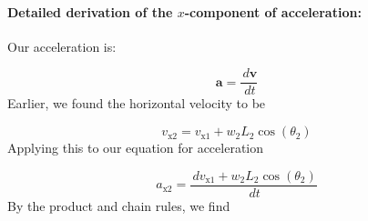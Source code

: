\documentclass[12pt]{article}
\begin{document}
\paragraph{Detailed derivation of the $x$-component of acceleration:}
\label{GD:accelerationX2Deriv}
Our acceleration is:

\begin{displaymath}
\symbf{a}=\frac{\,d\symbf{v}}{\,dt}
\end{displaymath}
Earlier, we found the horizontal velocity to be

\begin{displaymath}
{v_{\text{x}2}}={v_{\text{x}1}}+{w_{2}} {L_{2}} \cos\left({θ_{2}}\right)
\end{displaymath}
Applying this to our equation for acceleration

\begin{displaymath}
{a_{\text{x}2}}=\frac{\,d{v_{\text{x}1}}+{w_{2}} {L_{2}} \cos\left({θ_{2}}\right)}{\,dt}
\end{displaymath}
By the product and chain rules, we find
\end{document}
